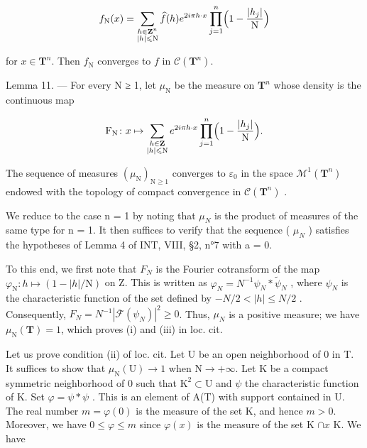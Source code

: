 \[
f_{\mathrm{N}}(x) = \sum_{\substack{h\in \mathbf{Z}^{n}\\ |h|\leqslant \mathrm{N}}}\widehat{f} (h)e^{2i\pi h\cdot x}\prod_{j = 1}^{n}\Bigl (1 - \frac{|h_{j}|}{\mathrm{N}}\Bigr)
\]

for \(x\in \mathbf{T}^n\). Then \(f_{\mathrm{N}}\) converges to \(f\) in \(\mathcal{C}(\mathbf{T}^n)\).

Lemma 11. --- For every N ≥ 1, let \(\mu_{\mathrm{N}}\) be the measure on \(\mathbf{T}^{n}\) whose density is the continuous map

\[
\mathrm{F}_{\mathrm{N}}\colon x\mapsto \sum_{\substack{h\in \mathbf{Z}\\ |h|\leqslant \mathrm{N}}}e^{2i\pi h\cdot x}\prod_{j = 1}^{n}\Bigl (1 - \frac{|h_{j}|}{\mathrm{N}}\Bigr).
\]

The sequence of measures \((\mu_{\mathrm{N}})_{\mathrm{N}\geqslant1}\) converges to \(\varepsilon_{0}\) in the space \(\mathcal{M}^{1}(\mathbf{T}^{n})\) endowed with the topology of compact convergence in \(\mathcal{C}(\mathbf{T}^{n})\) .

We reduce to the case n = 1 by noting that \(\mu_{N}\) is the product of measures of the same type for n = 1. It then suffices to verify that the sequence ( \(\mu_{N}\) ) satisfies the hypotheses of Lemma 4 of INT, VIII, §2, n°7 with a = 0.

To this end, we first note that \(F_{N}\) is the Fourier cotransform of the map \(\varphi_{\mathrm{N}}\colon h\mapsto(1-|h|/\mathrm{N})\) on Z. This is written as \(\varphi_{N}=N^{-1}\psi_{N}*\widetilde{\psi}_{N}\) , where \(\psi_{N}\) is the characteristic function of the set defined by \(-N/2<|h|\leqslant N/2\) . Consequently, \(F_{N}=N^{-1}|\overline{\mathcal{F}}(\psi_{N})|^{2}\geqslant0\). Thus, \(\mu_{N}\) is a positive measure; we have \(\mu_{\mathrm{N}}(\mathbf{T})=1\), which proves (i) and (iii) in loc. cit.

Let us prove condition (ii) of loc. cit. Let U be an open neighborhood of 0 in T. It suffices to show that \(\mu_{\mathrm{N}}(\mathrm{U}) \to 1\) when \(\mathrm{N} \to +\infty\). Let K be a compact symmetric neighborhood of 0 such that \(\mathrm{K}^2 \subset \mathrm{U}\) and \(\psi\) the characteristic function of K. Set \(\varphi = \psi * \psi\) . This is an element of A(T) with support contained in U. The real number \(m = \varphi(0)\) is the measure of the set K, and hence \(m > 0\). Moreover, we have \(0 \leqslant \varphi \leqslant m\) since \(\varphi(x)\) is the measure of the set K \(\cap x\) K. We have


